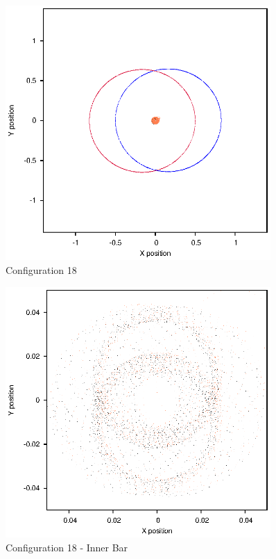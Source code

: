 \documentclass[a4paper,12pt]{article}
\begin{document}
\begin{figure}[H]
\centering
\includegraphics[width=0.9\textwidth]{./2017results/05-75-05-3/Orbit.eps}
\caption{Configuration 18}
\label{fig:config18}
\end{figure}
\begin{figure}[H]
\centering
\includegraphics[width=0.9\textwidth]{./2017results/05-75-05-3/Inner.eps}
\caption{Configuration 18 - Inner Bar}
\label{fig:config18i}
\end{figure}
\end{document}
